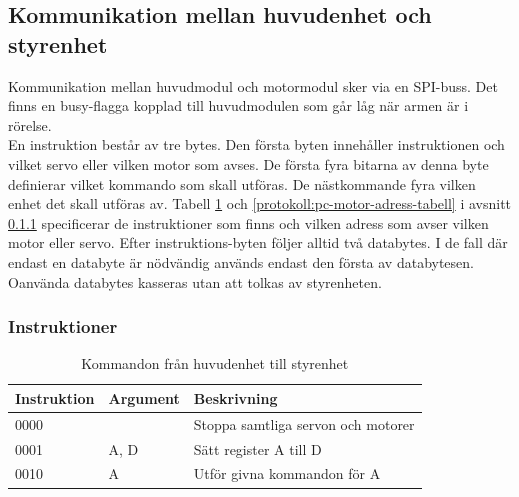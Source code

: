 \subsection{Kommunikation mellan huvudenhet och styrenhet} \label{protokoll:pc-motor}
Kommunikation mellan huvudmodul och motormodul sker via en SPI-buss. Det finns en busy-flagga kopplad till huvudmodulen som går låg när armen är i rörelse. \\
En instruktion består av tre bytes. Den första byten innehåller instruktionen och vilket servo eller vilken motor som avses. De första fyra bitarna av denna byte definierar vilket kommando som skall utföras. De nästkommande fyra vilken enhet det skall utföras av. Tabell \ref{protokoll:pc-motor-tabell} och \ref{protokoll:pc-motor-adress-tabell} i avsnitt \ref{designspec:protokoll-pc-motor-instr} specificerar de instruktioner som finns och vilken adress som avser vilken motor eller servo. Efter instruktions-byten följer alltid två databytes. I de fall där endast en databyte är nödvändig används endast den första av databytesen. Oanvända databytes kasseras utan att tolkas av styrenheten.

\subsubsection{Instruktioner} \label{designspec:protokoll-pc-motor-instr}

\begin{table}[h]
	\centering
		\begin{tabularx}{\textwidth}{| l | l | X |}
			\hline
			\textbf{Instruktion} & \textbf{Argument} & \textbf{Beskrivning} \\
			\hline
			{0000} & {} & {Stoppa samtliga servon och motorer} \\
			\hline
			{0001} & {A, D} & {Sätt register A till D} \\
			\hline
			{0010} & {A} & {Utför givna kommandon för A} \\
			\hline
		\end{tabularx}
	\caption{Kommandon från huvudenhet till styrenhet} \label{protokoll:pc-motor-tabell}
\end{table}

